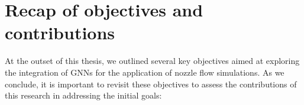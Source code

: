 

\section{Recap of objectives and contributions}
At the outset of this thesis, we outlined several key objectives aimed at exploring the integration of GNNs for the application of nozzle flow simulations. As we conclude, it is important to revisit these objectives to assess the contributions of this research in addressing the initial goals:


